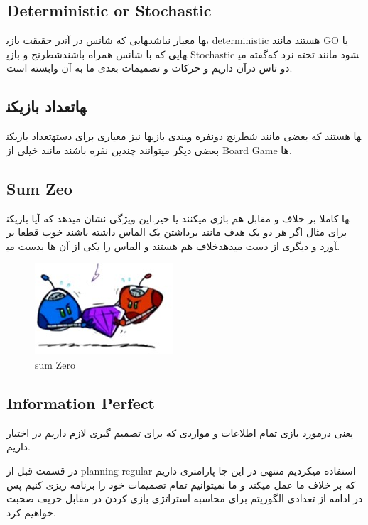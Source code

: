 \subsection{Deterministic or Stochastic}
در حقیقت بازی‎هایی که شانس در آن‎ها معیار نباشد، deterministic هستند مانند GO یا شطرنج و بازی‎هایی که با شانس همراه باشند Stochastic گفته می‎شود مانند تخته نرد که دو تاس درآن داریم و حرکات و تصمیمات بعدی ما به آن وابسته است.

\subsection{تعداد بازیکن‎ها}
تعداد بازیکن‎ها نیز معیاری برای دسته‎بندی بازی‎ها هستند که بعضی مانند شطرنج دونفره و بعضی دیگر میتوانند چندین نفره باشند مانند خیلی از Board Game ها.

\subsection{Sum Zeo}
این ویژگی نشان میدهد که آیا بازیکن‎ها کاملا بر خلاف و مقابل هم بازی میکنند یا خیر. برای مثال اگر هر دو یک هدف مانند برداشتن یک الماس داشته باشند خوب قطعا بر خلاف هم هستند و الماس را یکی از آن ها بدست می‎آورد و دیگری از دست میدهد.

\begin{figure}[h!]
    \centering
    \includegraphics[width=0.3\linewidth]{images/zerosum.jpg}
    \caption{sum Zero}
\end{figure}


\subsection{Information Perfect}
یعنی درمورد بازی تمام اطلاعات و مواردی که برای تصمیم گیری لازم داریم در اختیار داریم.


در قسمت قبل از planning regular استفاده میکردیم منتهی در این جا پارامتری داریم که بر خلاف ما عمل میکند و ما نمیتوانیم تمام تصمیمات خود را برنامه ریزی کنیم پس در ادامه از تعدادی الگوریتم برای محاسبه استراتژی بازی کردن در مقابل حریف صحبت خواهیم کرد.




